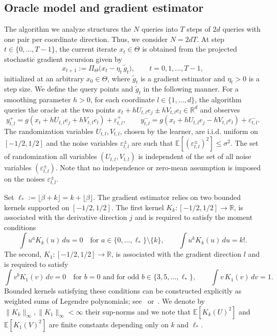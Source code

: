 \documentclass{article}
\makeatletter
\renewcommand{\leq}{\leqslant}
\newcommand{\iid}{i.i.d.\@\xspace}
\theoremstyle{definition}
\makeatother
\begin{document}
\subsection{Oracle model and gradient estimator}

The algorithm we analyze structures the $N$ queries into 
$T$ steps of $2d$ queries with one pair per 
coordinate direction. Thus, we consider $N=2dT$. At step 
$t\in\{0,\dots,T-1\}$, the current iterate $x_t\in\Theta$ is obtained from the projected stochastic 
gradient recursion given by
\begin{equation}
\label{eq:sgd}
x_{t+1}:=\Pi_\Theta\bigl(x_t-\eta_t\,\tilde{g}_t\bigr),
\qquad t=0,1,\dots,T-1,
\end{equation}
initialized at an arbitrary $x_0\in\Theta$, where $\tilde{g}_t$ is a gradient estimator and $\eta_t >0$ is a step size. We define the query points and $\tilde{g}_t$ in the following manner. For a smoothing parameter $h>0$, for each coordinate 
$l\in\{1,\dots,d\}$, the algorithm queries the oracle at the two 
points 
$x_t+hU_{t,l}e_j\pm hV_{t,l}e_l\in\mathbb{R}^d$ and observes
\begin{equation}
\label{eq:oracle}
y^+_{t,l}=g(x_t+hU_{t,l}e_j+hV_{t,l}e_l)+\varepsilon^+_{t,l},
\qquad
y^-_{t,l}=g(x_t+hU_{t,l}e_j-hV_{t,l}e_l)+\varepsilon^-_{t,l}.
\end{equation}
The randomization variables $U_{t,l},V_{t,l}$, chosen by the learner, are \iid uniform 
on $[-1/2,1/2]$ and the noise variables 
$\varepsilon^\pm_{t,l}$ are such that
$\mathbb{E}[(\varepsilon^\pm_{t,l})^2]\leq\sigma^2$. The set of randomization all variables $(U_{t,l},V_{t,l})$ is independent of the set of all noise variables $(\varepsilon^\pm_{t,l})$. Note that no independence or zero-mean assumption is imposed on the noises $\varepsilon^\pm_{t,l}$. %

\medskip

Set $\ell_*:=\lfloor\beta+k\rfloor=k+\lfloor\beta\rfloor$. The 
gradient estimator relies on two bounded kernels supported on 
$[-1/2,1/2]$. The first kernel $K_k:[-1/2,1/2]\to\mathbb{R}$, is 
associated with the derivative direction $j$ and is required to 
satisfy the moment conditions
\begin{equation}
\label{eq:Kk-moments}
\int u^a K_k(u)\,du=0\quad\text{for }a\in\{0,\dots,\ell_*\}\setminus\{k\},
\qquad
\int u^k K_k(u)\,du=k!.
\end{equation}
The second, $K_1:[-1/2,1/2]\to\mathbb{R}$, is associated with 
the gradient direction $l$ and is required to satisfy
\begin{equation}
\label{eq:K1-moments}
\int v^b K_1(v)\,dv=0\quad\text{for } b=0 \text{ and for odd } b\in\{3,5,\dots,\ell_*\},
\qquad
\int v\,K_1(v)\,dv=1.
\end{equation}
Bounded kernels satisfying these conditions can be constructed 
explicitly as weighted sums of Legendre polynomials; 
see~\citep[Section~1.2.2]{tsybakov2009nonparametric} or~\cite{bach2016highly}. We denote 
by $\|K_k\|_\infty,\|K_1\|_\infty<\infty$ their sup-norms and we 
note that $\mathbb{E}[K_k(U)^2]$ and $\mathbb{E}[K_1(V)^2]$ are 
finite constants depending only on $k$ and $\ell_*$.
\end{document}

